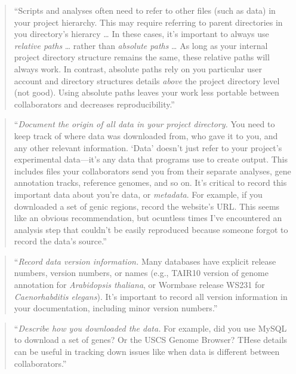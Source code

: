 \documentclass[]{tufte-book}
\begin{document}
\begin{quote}
``Scripts and analyses often need to refer to other files (such as data) in your
project hierarchy. This may require referring to parent directories in you directory's
hierarcy \ldots{} In these cases, it's important to always use \emph{relative paths} \ldots{} rather
than \emph{absolute paths} \ldots{} As long as your internal project directory structure remains the
same, these relative paths will always work. In contrast, absolute paths rely on you particular
user account and directory structures details \emph{above} the project directory level
(not good). Using absolute paths leaves your work less portable between collaborators and
decreases reproducibility.'' \citep{buffalo2015bioinformatics}
\end{quote}

\begin{quote}
``\emph{Document the origin of all data in your project directory.} You need to keep track of
where data was downloaded from, who gave it to you, and any other relevant information.
`Data' doesn't just refer to your project's experimental data---it's any data that
programs use to create output. This includes files your collaborators send you from their
separate analyses, gene annotation tracks, reference genomes, and so on. It's critical
to record this important data about you're data, or \emph{metadata}. For example, if you downloaded
a set of genic regions, record the website's URL. This seems like an obvious recommendation,
but ocuntless times I've encountered an analysis step that couldn't be easily reproduced
because someone forgot to record the data's source.'' \citep{buffalo2015bioinformatics}
\end{quote}

\begin{quote}
``\emph{Record data version information.} Many databases have explicit release numbers,
version numbers, or names (e.g., TAIR10 version of genome annotation for \emph{Arabidopsis
thaliana}, or Wormbase release WS231 for \emph{Caenorhabditis elegans}). It's important to
record all version information in your documentation, including minor version numbers.''
\citep{buffalo2015bioinformatics}
\end{quote}

\begin{quote}
``\emph{Describe how you downloaded the data.} For example, did you use MySQL to download a
set of genes? Or the USCS Genome Browser? THese details can be useful in tracking down
issues like when data is different between collaborators.'' \citep{buffalo2015bioinformatics}
\end{quote}
\end{document}
